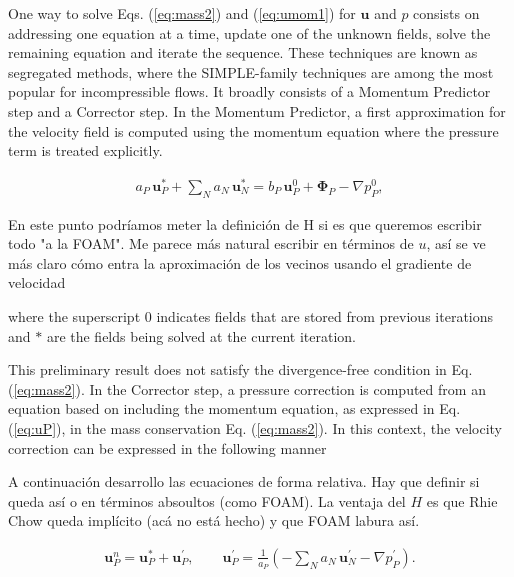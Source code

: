 \documentclass[final,3p,times,10pt,onecolumn]{myElsarticle}
\numberwithin{equation}{section}
\newcommand{\CIP}[1]{{\color{blue} #1}}
\begin{document}
One way to solve Eqs. (\ref{eq:mass2}) and (\ref{eq:umom1}) for $\boldsymbol{u}$ and $p$ consists on addressing one equation at a time, update one of the unknown fields, solve the remaining equation and iterate the sequence. These techniques are known as segregated methods, where the SIMPLE-family techniques \cite{patankar1972,patankar1980,patankar1981,vanDoormal,issa} are among the most popular for incompressible flows. It broadly consists of a Momentum Predictor step and a Corrector step. In the Momentum Predictor, a first approximation for the velocity field is computed using the momentum equation where the pressure term is treated explicitly. 
{\color{red}
\begin{equation} \label{eq:MOMPRED}
\begin{split}
a_P\, \boldsymbol{u}_P^{*} + \sum_{N} a_{N}\, \boldsymbol{u}_{N}^{*} = b_P\, \boldsymbol{u}^0_P + \boldsymbol{\Phi}_P - \nabla p_P^{0},
\end{split}
\end{equation}

\CIP{En este punto podríamos meter la definición de H si es que queremos escribir todo "a la FOAM". Me parece más natural escribir en términos de $u$, así se ve más claro cómo entra la aproximación de los vecinos usando el gradiente de velocidad}

\noindent where the superscript $0$ indicates fields that are stored from previous iterations and $*$ are the fields being solved at the current iteration. }
This preliminary result does not satisfy the divergence-free condition in Eq. (\ref{eq:mass2}). In the Corrector step, a pressure correction is computed from an equation based on including the momentum equation, as expressed in Eq. (\ref{eq:uP}), in the mass conservation  Eq. (\ref{eq:mass2}). In this context, the velocity correction can be expressed in the following manner

\CIP{A continuación desarrollo las ecuaciones de forma relativa. Hay que definir si queda así o en términos absoultos (como FOAM). La ventaja del $H$ es que Rhie Chow queda implícito (acá no está hecho) y que FOAM labura así.}

\begin{equation}\label{eq:uprimeDef}
\begin{split}
\boldsymbol{u}_P^{n} = \boldsymbol{u}_P^{*} + \boldsymbol{u}_P^{'}, \qquad \boldsymbol{u}_P^{'} = \frac{1}{a_P}\left(-\sum_{N} a_{N}\, \boldsymbol{u}_N^{'}- \nabla p_P^{'}\right).
\end{split}
\end{equation}
\end{document}

